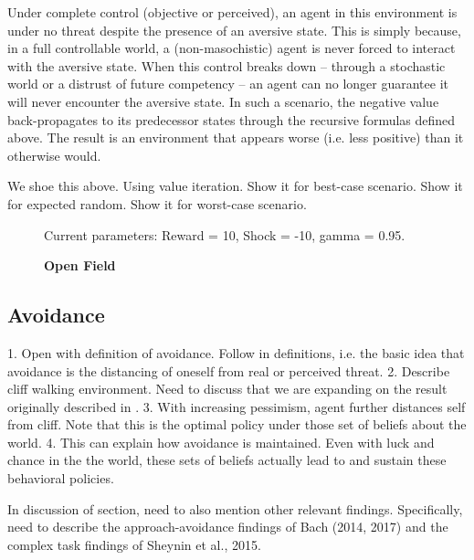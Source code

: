 \documentclass[11pt]{article} %
\begin{document}
Under complete control (objective or perceived), an agent in this environment is
under no threat despite the presence of an aversive state. This is simply because,
in a full controllable world, a (non-masochistic) agent is never forced to interact
with the aversive state. When this control breaks down -- through a stochastic
world or a distrust of future competency -- an agent can no longer guarantee it
will never encounter the aversive state. In such a scenario, the negative value
back-propagates to its predecessor states through the recursive formulas defined
above. The result is an environment that appears worse (i.e. less positive) than
it otherwise would.

We shoe this above. Using value iteration. Show it for best-case scenario. Show
it for expected random. Show it for worst-case scenario.

\begin{figure}
  \centerline{%
  }
  \caption{\textbf{Open Field}}
  \par Current parameters: Reward = 10, Shock = -10, gamma = 0.95.
\end{figure}

\subsection{Avoidance}

1. Open with definition of avoidance. Follow \cite{Arnaudova2017} in definitions, i.e.
the basic idea that avoidance is the distancing of oneself from real or perceived
threat.
2. Describe cliff walking environment. Need to discuss that we are expanding
on the result originally described in \cite{Gaskett2003}.
3. With increasing pessimism, agent further distances self from cliff. Note that
this is the optimal policy under those set of beliefs about the world.
4. This can explain how avoidance is maintained. Even with luck and chance in the
the world, these sets of beliefs actually lead to and sustain these behavioral
policies.

In discussion of section, need to also mention other relevant findings. Specifically,
need to describe the approach-avoidance findings of Bach (2014, 2017) and the
complex task findings of Sheynin et al., 2015.
\end{document}
